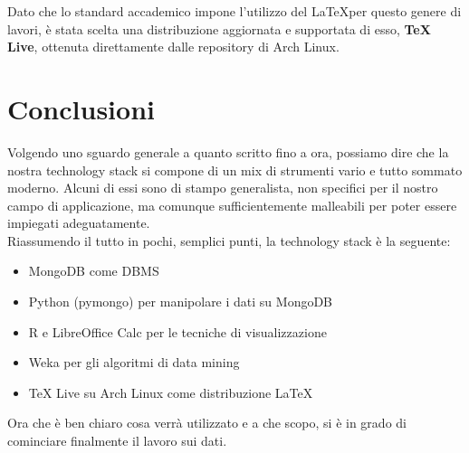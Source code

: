     Dato che lo standard accademico impone l'utilizzo del \LaTeX per questo genere di lavori, è stata scelta una distribuzione aggiornata e supportata di esso, \textbf{TeX Live}, ottenuta direttamente dalle repository di Arch Linux.

\section{Conclusioni}

    Volgendo uno sguardo generale a quanto scritto fino a ora, possiamo dire che la nostra technology stack si compone di un mix di strumenti vario e tutto sommato moderno. Alcuni di essi sono di stampo generalista, non specifici per il nostro campo di applicazione, ma comunque sufficientemente malleabili per poter essere impiegati adeguatamente. \\

    Riassumendo il tutto in pochi, semplici punti, la technology stack è la seguente:

    \begin{itemize}
        \item MongoDB come DBMS
        \item Python (pymongo) per manipolare i dati su MongoDB
        \item R e LibreOffice Calc per le tecniche di visualizzazione
        \item Weka per gli algoritmi di data mining
        \item TeX Live su Arch Linux come distribuzione \LaTeX
    \end{itemize}

    Ora che è ben chiaro cosa verrà utilizzato e a che scopo, si è in grado di cominciare finalmente il lavoro sui dati.

